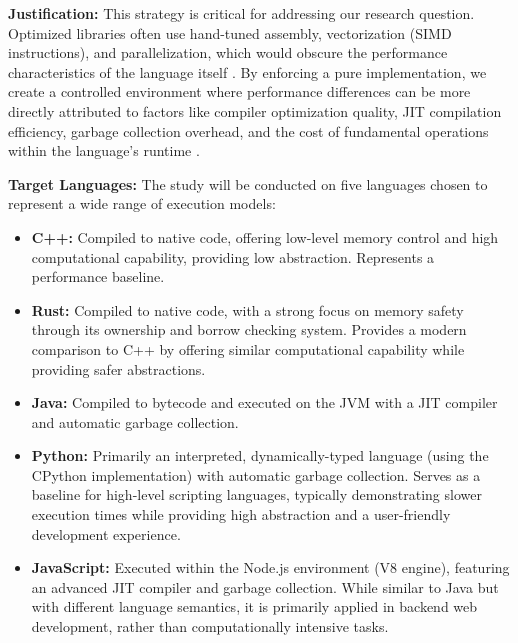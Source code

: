 \documentclass[11pt, a4paper, titlepage]{scrartcl}
\begin{document}
\textbf{Justification:} This strategy is critical for addressing our research question. Optimized libraries often use hand-tuned assembly, vectorization (SIMD instructions), and parallelization, which would obscure the performance characteristics of the language itself \autocite{Luo2021}. By enforcing a pure implementation, we create a controlled environment where performance differences can be more directly attributed to factors like compiler optimization quality, JIT compilation efficiency, garbage collection overhead, and the cost of fundamental operations within the language's runtime \autocite{Lin2021}.

\textbf{Target Languages:} The study will be conducted on five languages chosen to represent a wide range of execution models:
\begin{itemize}
    \item \textbf{C++:} Compiled to native code, offering low-level memory control and high computational capability, providing low abstraction. Represents a performance baseline.
    \item \textbf{Rust:} Compiled to native code, with a strong focus on memory safety through its ownership and borrow checking system. Provides a modern comparison to C++ by offering similar computational capability while providing safer abstractions.
    \item \textbf{Java:} Compiled to bytecode and executed on the JVM with a JIT compiler and automatic garbage collection.
    \item \textbf{Python:} Primarily an interpreted, dynamically-typed language (using the CPython implementation) with automatic garbage collection. Serves as a baseline for high-level scripting languages, typically demonstrating slower execution times while providing high abstraction and a user-friendly development experience.
    \item \textbf{JavaScript:} Executed within the Node.js environment (V8 engine), featuring an advanced JIT compiler and garbage collection. While similar to Java but with different language semantics, it is primarily applied in backend web development, rather than computationally intensive tasks.
\end{itemize}
\end{document}
